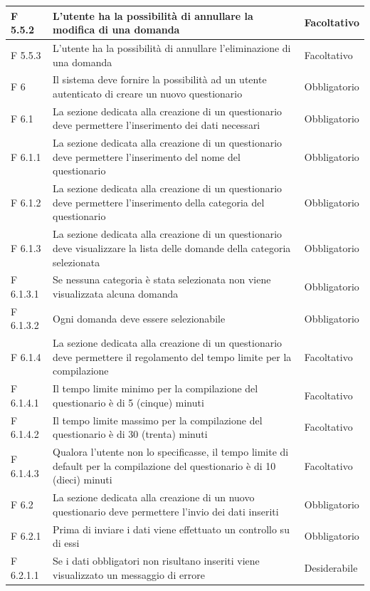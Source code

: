 \documentclass[a4paper,11pt]{article}
\begin{document}
\begin{longtable}{p{}p{}p{}}
\midrule
F 5.5.2 & L'utente ha la possibilità di annullare la modifica di una domanda & Facoltativo\\
\midrule
F 5.5.3 & L'utente ha la possibilità di annullare l'eliminazione di una domanda & Facoltativo\\
\midrule
F 6 & Il sistema deve fornire la possibilità ad un utente autenticato di creare un nuovo questionario & Obbligatorio\\
\midrule
F 6.1 & La sezione dedicata alla creazione di un questionario deve permettere l'inserimento dei dati necessari & Obbligatorio\\
\midrule
F 6.1.1 & La sezione dedicata alla creazione di un questionario deve permettere l'inserimento del nome del questionario & Obbligatorio\\
\midrule
F 6.1.2 & La sezione dedicata alla creazione di un questionario deve permettere l'inserimento della categoria del questionario & Obbligatorio\\
\midrule
F 6.1.3 & La sezione dedicata alla creazione di un questionario deve visualizzare la lista delle domande della categoria selezionata & Obbligatorio\\
\midrule
F 6.1.3.1 & Se nessuna categoria è stata selezionata non viene visualizzata alcuna domanda & Obbligatorio\\
\midrule
F 6.1.3.2 & Ogni domanda deve essere selezionabile & Obbligatorio\\
\midrule
F 6.1.4 & La sezione dedicata alla creazione di un questionario deve permettere il regolamento del tempo limite per la compilazione & Facoltativo\\
\midrule
F 6.1.4.1 & Il tempo limite minimo per la compilazione del questionario è di 5 (cinque) minuti & Facoltativo\\
\midrule
F 6.1.4.2 & Il tempo limite massimo per la compilazione del questionario è di 30 (trenta) minuti & Facoltativo\\
\midrule
F 6.1.4.3 & Qualora l'utente non lo specificasse, il tempo limite di default per la compilazione del questionario è di 10 (dieci) minuti & Facoltativo\\
\midrule
F 6.2 & La sezione dedicata alla creazione di un nuovo questionario deve permettere l'invio dei dati inseriti & Obbligatorio\\
\midrule
F 6.2.1 & Prima di inviare i dati viene effettuato un controllo su di essi & Obbligatorio\\
\midrule
F 6.2.1.1 & Se i dati obbligatori non risultano inseriti viene visualizzato un messaggio di errore & Desiderabile\\

\end{longtable}
\end{document}
